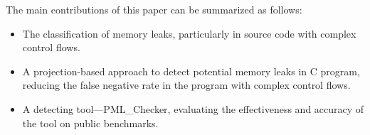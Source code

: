 
The main contributions of this paper can be summarized as follows:
\begin{itemize}
\item The classification of memory leaks, particularly in source code with complex control flows.
\item A projection-based approach to detect potential memory leaks in C program, reducing the false negative rate in the program with complex control flows.
\item A detecting tool---PML\_Checker, evaluating the effectiveness and accuracy of the tool on public benchmarks. 
\end{itemize}

